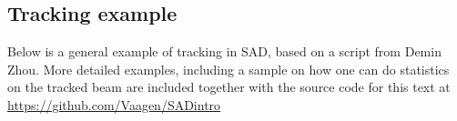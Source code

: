 \documentclass{article}
\newcommand{\sourceLocation}{\url{https://github.com/Vaagen/SADintro}}
\begin{document}
%
%
%
%
%
%

\subsection{Tracking example}
Below is a general example of tracking in SAD, based on a script from Demin Zhou. More detailed examples, including a sample on how one can do statistics on the tracked beam are included together with the source code for this text at \sourceLocation



\end{document}
